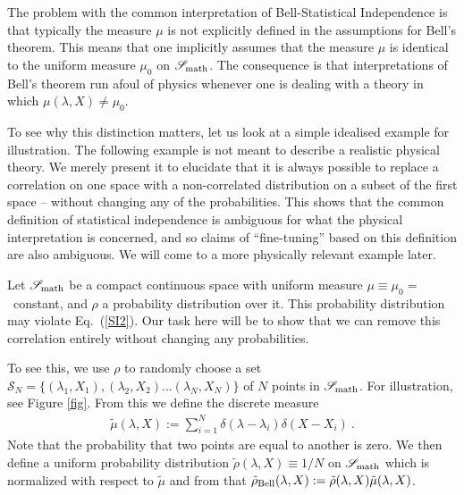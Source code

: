 \documentclass{article}
\begin{document}
The problem with the common interpretation of Bell-Statistical Independence is that typically the measure $\mu$ is not explicitly defined in the assumptions for Bell's theorem. This means that one implicitly assumes that the measure $\mu$ is identical to the uniform measure $\mu_0$ on ${\mathscr S}_{\rm math}$. The consequence is that interpretations of Bell's theorem run afoul of physics whenever one is dealing with a theory in which $\mu(\lambda,X) \ne \mu_0$.

To see why this distinction matters, let us look at a simple idealised example for illustration. The following example is not meant to describe a realistic physical theory. We merely present it to elucidate that it is always possible to replace a correlation on one space with a non-correlated distribution on a subset of the first space -- without changing any of the probabilities. This shows that the common definition of statistical independence is ambiguous for what the physical interpretation is concerned, and so claims of ``fine-tuning'' based on this definition are also ambiguous. We will come to a more physically relevant example later. 

Let ${\mathscr S}_{\rm math}$ be a compact continuous space with uniform measure $\mu \equiv \mu_0 =$~constant, and $\rho$ a probability distribution over it. This probability distribution may violate Eq.\ (\ref{SI2}). Our task here will be to show that we can remove this correlation entirely without changing any probabilities. 

To see this, we use $\rho$ to randomly choose a set ${\mathscr S}_N = \{ (\lambda_1,X_1),(\lambda_2,X_2)...(\lambda_N,X_N)\}$ of $N$ points in ${\mathscr S}_{\rm math}$. For illustration, see Figure \ref{fig}. From this we define the discrete measure
\begin{eqnarray}
\tilde \mu(\lambda,X) := \sum_{i=1}^N \delta(\lambda - \lambda_i) \delta(X-X_i)~.
\end{eqnarray}
Note that the probability that two points are equal to another is zero.
We then define a uniform probability distribution $\tilde \rho(\lambda,X) \equiv 1/N$ on ${\mathscr S}_{\rm math}$ which is normalized with respect to $\tilde \mu$ and from that $\tilde \rho_{\rm Bell}(\lambda,X):= \tilde \rho(\lambda,X) \tilde \mu(\lambda,X)$.
\end{document}
